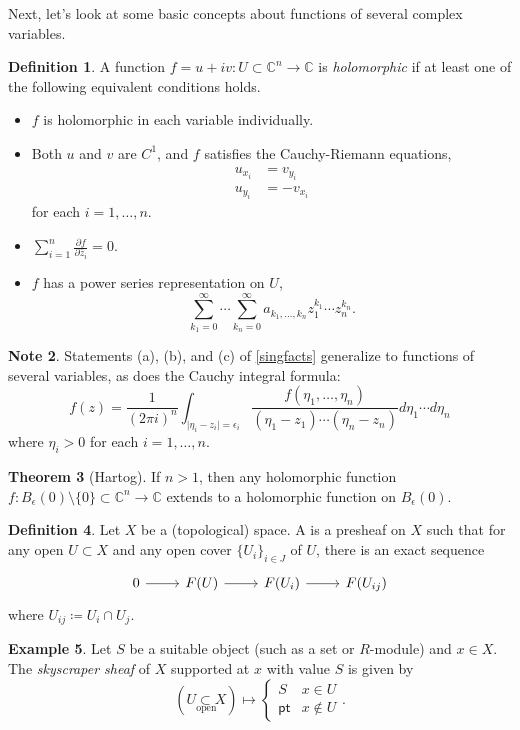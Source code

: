 \documentclass[10pt,letterpaper,cm]{nupset}
\theoremstyle{definition}
\newtheorem{defn}{Definition}[subsection]
\newtheorem{exmp}[defn]{Example}
\newtheorem{note}[defn]{Note}
\theoremstyle{theorem}
\newtheorem{theorem}[defn]{Theorem}
\theoremstyle{remark}
\newcommand{\C}{\mathbb C}
\newcommand{\1}{\mathbb{1}}
\newcommand{\0}{\vec 0}
\newcommand{\pt}{\mathsf{pt}}
\newcommand{\bi}{\begin{itemize}}
\newcommand{\ei}{\end{itemize}}
\begin{document}
\medskip

Next, let's look at some basic concepts about functions of several complex variables.

\begin{defn}
A function $f = u +iv: U\subset \C^n \to \C$ is \textit{holomorphic} if at least one of  the following equivalent conditions holds.
\bi
\item $f$ is holomorphic in each variable individually.
\item  Both $u$ and $v$ are $C^1$, and $f$ satisfies the Cauchy-Riemann equations,
\begin{align*}
u_{x_i} & = v_{y_i}
\\ u_{y_i} & = {-v_{x_i}}
\end{align*}
for each $i=1, \ldots, n$.
\item $\sum_{i=1}^n\frac{\partial{f}}{\partial{\bar{z}_i}} =0$.
\item $f$ has a power series representation on $U$,
\[
\sum_{k_1=0}^{\infty}\cdots \sum_{k_n=0}^{\infty} a_{k_1, \ldots, k_n}z_1^{k_1}\cdots z_n^{k_n}.
\]
\ei
\end{defn}

\begin{note}
Statements (a), (b), and (c) of \cref{singfacts} generalize to functions of several variables, as does the Cauchy integral formula:
\[
f(z) = \frac{1}{(2\pi i)^n} \int_{\lvert{\eta_i - z_i}\rvert = \epsilon_i} \frac{f(\eta_1, \ldots, \eta_n)}{(\eta_1 - z_1)\cdots (\eta_n - z_n)}d{\eta_1}\cdots d{\eta_n}
\] where $\eta_i >0$ for each $i=1, \ldots, n$.
\end{note}

\begin{theorem}[Hartog]
If $n>1$, then any holomorphic function $f: B_{\epsilon}(0)\setminus \{0\} \subset \C^n \to \C$ extends to a holomorphic function on $B_{\epsilon}(0)$.
\end{theorem}

\begin{defn} Let $X$ be a (topological) space. A  is a presheaf on $X$ such that for any open $U\subset X$ and any open cover $\{U_i\}_{i\in J}$ of $U$, there is an exact sequence
\[
\begin{tikzcd}
0 \arrow[r] & F(U) \arrow[r] & F(U_i) \arrow[r] & F(U_{ij})
\end{tikzcd}
\] where $U_{ij} \coloneqq U_i \cap U_j$.
\end{defn}

\begin{exmp}
Let $S$ be a suitable object (such as a set or $R$-module)  and $x\in X$. The \textit{skyscraper sheaf} of $X$ supported at $x$ with value $S$ is given by
\[
\left(\underset{\text{open}}{U \subset X}\right) \mapsto \begin{cases}
S & x\in U
\\ \pt & x\notin U
\end{cases}.
\]
\end{exmp}
\end{document}
